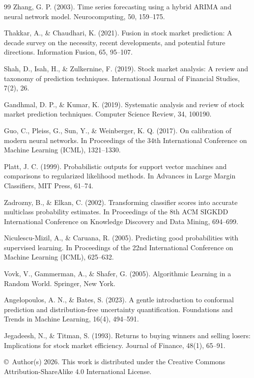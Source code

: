 \documentclass[10pt,a4paper,twocolumn]{article}
\begin{document}
\begin{thebibliography}{99}
 Zhang, G. P. (2003). Time series forecasting using a hybrid ARIMA and neural network model. Neurocomputing, 50, 159--175.

 Thakkar, A., \& Chaudhari, K. (2021). Fusion in stock market prediction: A decade survey on the necessity, recent developments, and potential future directions. Information Fusion, 65, 95--107.

 Shah, D., Isah, H., \& Zulkernine, F. (2019). Stock market analysis: A review and taxonomy of prediction techniques. International Journal of Financial Studies, 7(2), 26.

 Gandhmal, D. P., \& Kumar, K. (2019). Systematic analysis and review of stock market prediction techniques. Computer Science Review, 34, 100190.

 Guo, C., Pleiss, G., Sun, Y., \& Weinberger, K. Q. (2017). On calibration of modern neural networks. In Proceedings of the 34th International Conference on Machine Learning (ICML), 1321--1330.

 Platt, J. C. (1999). Probabilistic outputs for support vector machines and comparisons to regularized likelihood methods. In Advances in Large Margin Classifiers, MIT Press, 61--74.

 Zadrozny, B., \& Elkan, C. (2002). Transforming classifier scores into accurate multiclass probability estimates. In Proceedings of the 8th ACM SIGKDD International Conference on Knowledge Discovery and Data Mining, 694--699.

 Niculescu-Mizil, A., \& Caruana, R. (2005). Predicting good probabilities with supervised learning. In Proceedings of the 22nd International Conference on Machine Learning (ICML), 625--632.

 Vovk, V., Gammerman, A., \& Shafer, G. (2005). Algorithmic Learning in a Random World. Springer, New York.

 Angelopoulos, A. N., \& Bates, S. (2023). A gentle introduction to conformal prediction and distribution-free uncertainty quantification. Foundations and Trends in Machine Learning, 16(4), 494--591.

 Jegadeesh, N., \& Titman, S. (1993). Returns to buying winners and selling losers: Implications for stock market efficiency. Journal of Finance, 48(1), 65--91.

\end{thebibliography}

\medskip
{\footnotesize \copyright\ Author(s) 2026. This work is distributed under the Creative Commons Attribution-ShareAlike 4.0 International License.}
\end{document}
